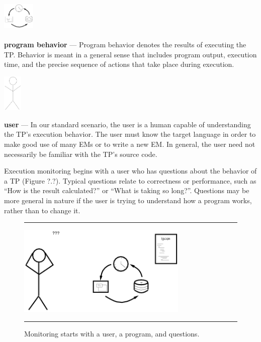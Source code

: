 \vspace{0.5in}

\flushleft
\includegraphics[width=0.6in,height=0.6in]{behave.png}
\vspace{-0.8in}\hspace{0.5in}\parbox{27pc}{{\bf program behavior} ---
Program behavior denotes the results of executing the TP.  Behavior is meant
in a general sense
that includes program output, execution time, and the precise sequence
of actions that take place during execution.}

\vspace{0.65in}

\flushleft
\includegraphics[height=0.7in]{user.png}
\vspace{-0.9in}\hspace{0.5in}\parbox{27pc}{{\bf user} --- In our standard
scenario, the user is a human capable of understanding the TP's execution
behavior.  The user must know the target language in order to make good use
of many EMs or to write a new
EM.  In general, the user need not necessarily be familiar with the TP's
source code.}

\vspace{0.75in}

Execution monitoring begins with a user who has questions about the behavior
of a TP (Figure ?.?). Typical questions relate to correctness or performance,
such as ``How is the result calculated?'' or ``What is taking so long?''.
Questions may be more general in nature if the user is trying to understand
how a program works, rather than to change it.

\begin{figure}[tb]
\hrule\bigskip
\centering

\hspace{0.05in}
\includegraphics[height=1.7in]{scene1.png}

\caption{Monitoring starts with a user, a program, and questions.}
\medskip\hrule
\end{figure}

